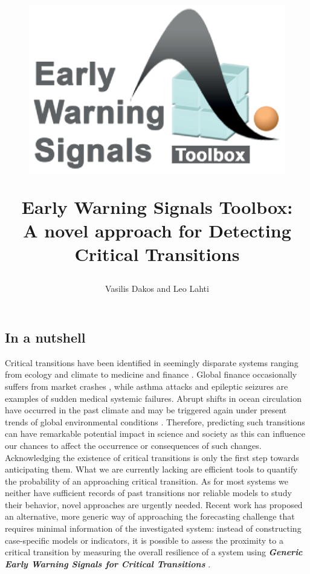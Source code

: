 \documentclass[12pt,a4paper,final]{article}
\author{Vasilis Dakos and Leo Lahti}
\title{
\begin{figure}[h]
\includegraphics[scale=0.55]{logoEWS.eps}
\end{figure}
Early Warning Signals Toolbox:\\ 
A novel approach for Detecting Critical Transitions
}
\begin{document}
\maketitle

\begin{doublespacing}

\section{In a nutshell} %

Critical transitions have been identified in seemingly disparate systems ranging from ecology and climate to medicine and finance \cite{Scheffer2001a,Scheffer2012}. Global finance occasionally suffers from market crashes \cite{May2008}, while asthma attacks \cite{Venegas2005} and epileptic seizures \cite{McSharry2003,Kramer2012} are examples of sudden medical systemic failures. Abrupt shifts in ocean circulation have occurred in the past climate \cite{Rahmstorf2002} and may be triggered again under present trends of global environmental conditions \cite{Lenton2011}. Therefore, predicting such transitions can have remarkable potential impact in science and society as this can influence our chances to affect the occurrence or consequences of such changes. Acknowledging the existence of critical transitions is only the first step towards anticipating them. What we are currently lacking are efficient tools to quantify the probability of an approaching critical transition. As for most systems we neither have sufficient records of past transitions nor reliable models to study their behavior, novel approaches are urgently needed. Recent work has proposed an alternative, more generic way of approaching the forecasting challenge that requires minimal information of the investigated system: instead of constructing case-specific models or indicators, it is possible to assess the proximity to a critical transition by measuring the overall resilience of a system using \textit{\textbf{Generic Early Warning Signals for Critical Transitions}} \cite{Scheffer2009a}.\\
\\
\\


\end{doublespacing}
\end{document}
